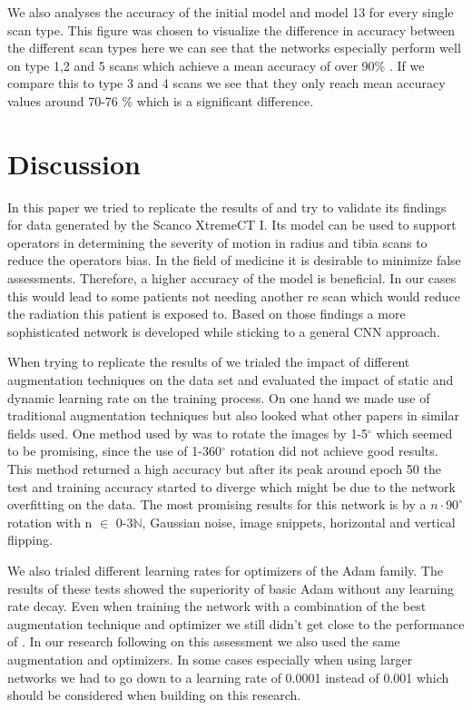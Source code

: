 \documentclass[
a4paper, 
12pt,
grayscalebody, %
abstract=on,
twoside, BCOR10mm, 12pt, DIV13,headinclude, footexclude, final, abstracton, openright
]{ibireprt}
\numberwithin{equation}{chapter}
\numberwithin{table}{chapter}
\numberwithin{figure}{chapter}
\numberwithin{algorithm}{chapter}
\numberwithin{example}{chapter}
\numberwithin{example}{chapter}
\begin{document}
We also analyses the accuracy of the initial model and model 13 for every single scan type. This figure was chosen to visualize the difference in accuracy between the different scan types here we can see that the networks especially perform well on type 1,2 and 5 scans which achieve a mean accuracy of over 90\% . If we compare this to type 3 and 4 scans we see that they only reach mean accuracy values around 70-76 \% which is a significant difference.
\chapter{Discussion}

In this paper we tried to replicate the results of \cite{Walle2023} and try to validate its findings for data generated by the Scanco XtremeCT I. Its model can be used to support operators in determining the severity of motion in radius and tibia scans to reduce the operators bias. In the field of medicine it is desirable to minimize false assessments. Therefore, a higher accuracy of the model is beneficial. In our cases this would lead to some patients not needing another re scan which would reduce the radiation this patient is exposed to. Based on those findings  a more sophisticated network is developed while sticking to a general CNN approach. 

When trying to replicate the results of \cite{Walle2023} we trialed the impact of different augmentation techniques on the data set and evaluated the impact of static and dynamic learning rate on the training process. On one hand we made use of traditional augmentation techniques but also looked what other papers in similar fields used. One method used by \cite{Zhang2020} was to rotate the images by 1-5$^{\circ}$ which seemed to be promising, since the use of 1-360$^{\circ}$ rotation did not achieve good results. This method returned a high accuracy but after its peak around epoch 50 the test and training accuracy started to diverge which might be due to the network overfitting on the data. The most promising results for this network is by  a $ n \cdot 90^{\circ} $ rotation with n $\in$ {0-3}$\mathbb{N}$, Gaussian noise, image snippets, horizontal and vertical flipping. 

We also trialed different learning rates for optimizers of the Adam family. The results of these tests showed the superiority of basic Adam without any learning rate decay. Even when training the network with a combination of the best augmentation technique and optimizer we still didn't get close to the performance of \cite{Walle2023}. In our research following on this assessment we also used the same augmentation and optimizers. In some cases especially when using larger networks we had to go down to a learning rate of 0.0001 instead of 0.001 which should be considered when building on this research.
\end{document}
